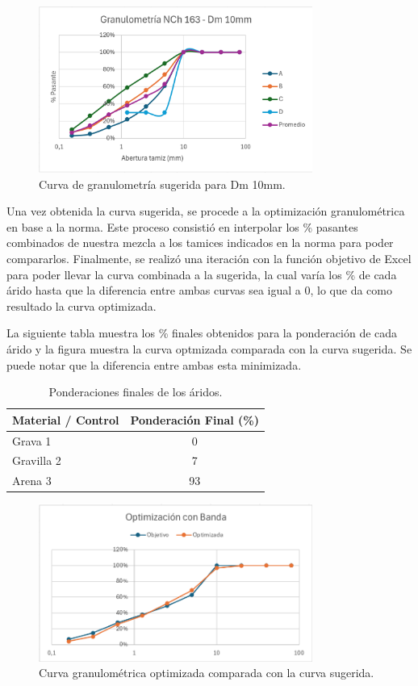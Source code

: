 \begin{figure}[H]
    \centering
    \includegraphics[width=0.8\textwidth]{GRAFICOS/NCh163.png}
    \caption{Curva de granulometría sugerida para Dm 10mm.}
\end{figure}

Una vez obtenida la curva sugerida, se procede a la optimización granulométrica en base a la norma. Este proceso consistió en interpolar los \% pasantes combinados de nuestra mezcla a los tamices indicados en la norma para poder compararlos. Finalmente, se realizó una iteración con la función objetivo de Excel para poder llevar la curva combinada a la sugerida, la cual varía los \% de cada árido hasta que la diferencia entre ambas curvas sea igual a 0, lo que da como resultado la curva optimizada.

La siguiente tabla muestra los \% finales obtenidos para la ponderación de cada árido y la figura muestra la curva optmizada comparada con la curva sugerida. Se puede notar que la diferencia entre ambas esta minimizada.

\begin{table}[H]
\centering
\caption{Ponderaciones finales de los áridos.}
\begin{tabular}{|l|c|}
\hline
\textbf{Material / Control} & \textbf{Ponderación Final (\%)} \\ \hline
Grava 1     & 0 \\ \hline
Gravilla 2  & 7 \\ \hline
Arena 3     & 93 \\ \hline
\end{tabular}
\end{table}

\begin{figure}[H]
    \centering
    \includegraphics[width=0.8\textwidth]{GRAFICOS/opti_banda.png}
    \caption{Curva granulométrica optimizada comparada con la curva sugerida.}
\end{figure}

